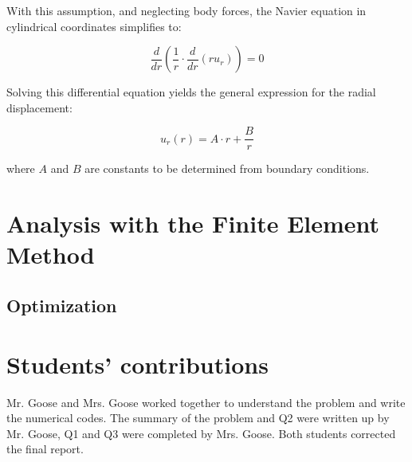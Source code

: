 \documentclass[12pt]{article}
\begin{document}
\vspace{0.5em}

With this assumption, and neglecting body forces, the Navier equation in cylindrical coordinates simplifies to:

\[
\frac{d}{dr} \left( \frac{1}{r} \cdot \frac{d}{dr}(r u_r) \right) = 0
\]

Solving this differential equation yields the general expression for the radial displacement:

\[
u_r(r) = A \cdot r + \frac{B}{r}
\]

where \( A \) and \( B \) are constants to be determined from boundary conditions.



    



\section{Analysis with the Finite Element Method}


\subsection{Optimization}


\vfill

\section*{Students' contributions}
Mr. Goose and Mrs. Goose worked together to understand the problem and write the numerical codes. The summary of the problem and Q2 were written up by Mr. Goose, Q1 and Q3 were completed by Mrs. Goose. Both students corrected the final report.

\newpage

\end{document}
